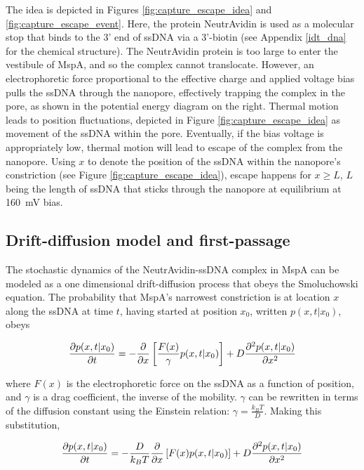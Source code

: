 The idea is depicted in Figures \ref{fig:capture_escape_idea} and \ref{fig:capture_escape_event}.  Here, the protein NeutrAvidin is used as a molecular stop that binds to the 3' end of ssDNA via a 3'-biotin (see Appendix \ref{idt_dna} for the chemical structure).  The NeutrAvidin protein is too large to enter the vestibule of MspA, and so the complex cannot translocate.  However, an electrophoretic force proportional to the effective charge and applied voltage bias pulls the ssDNA through the nanopore, effectively trapping the complex in the pore, as shown in the potential energy diagram on the right.  Thermal motion leads to position fluctuations, depicted in Figure \ref{fig:capture_escape_idea} as movement of the ssDNA within the pore.  Eventually, if the bias voltage is appropriately low, thermal motion will lead to escape of the complex from the nanopore.  Using $x$ to denote the position of the ssDNA within the nanopore's constriction (see Figure \ref{fig:capture_escape_idea}), escape happens for $x \geq L$, $L$ being the length of ssDNA that sticks through the nanopore at equilibrium at \SI{160}{\mV} bias.

\subsection{Drift-diffusion model and first-passage}

The stochastic dynamics of the NeutrAvidin-ssDNA complex in MspA can be modeled as a one dimensional drift-diffusion process that obeys the Smoluchowski equation.  The probability that MspA's narrowest constriction is at location $x$ along the ssDNA at time $t$, having started at position $x_0$, written $p(x,t|x_0)$, obeys

\begin{equation}
\frac{\partial p(x,t|x_0)}{\partial t} = - \frac{\partial}{\partial x} \left[ \frac{F(x)}{\gamma} p(x,t|x_0) \right] + D \frac{\partial^2 p(x,t|x_0)}{\partial x^2}
\label{eqn:drift_diffusion}
\end{equation}

\noindent
where $F(x)$ is the electrophoretic force on the ssDNA as a function of position, and $\gamma$ is a drag coefficient, the inverse of the mobility.  $\gamma$ can be rewritten in terms of the diffusion constant using the Einstein relation: $\gamma = \frac{k_B T}{D}$.  Making this substitution,

\begin{equation}
\frac{\partial p(x,t|x_0)}{\partial t} = - \frac{D}{k_B T} \frac{\partial}{\partial x} \left[ F(x) p(x,t|x_0) \right] + D \frac{\partial^2 p(x,t|x_0)}{\partial x^2}
\label{eqn:drift_diffusion2}
\end{equation}

